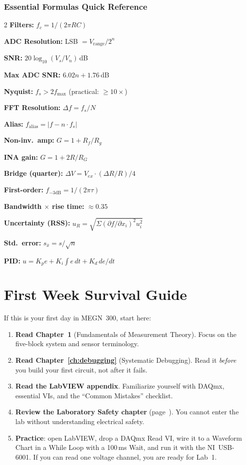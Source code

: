 \documentclass[11pt,letterpaper,twoside,openany]{book}
\begin{document}
\subsection*{Essential Formulas Quick Reference}
\begin{multicols}{2}
\small
\textbf{Filters:} $f_c = 1/(2\pi RC)$

\textbf{ADC Resolution:} LSB $= V_{\text{range}}/2^n$

\textbf{SNR:} $20\log_{10}(V_s/V_n)$\,dB

\textbf{Max ADC SNR:} $6.02n + 1.76$\,dB

\textbf{Nyquist:} $f_s > 2 f_{\max}$ (practical: $\geq 10\times$)

\textbf{FFT Resolution:} $\Delta f = f_s / N$

\textbf{Alias:} $f_{\text{alias}} = |f - n \cdot f_s|$

\textbf{Non-inv.\ amp:} $G = 1 + R_f/R_g$

\textbf{INA gain:} $G = 1 + 2R/R_G$

\textbf{Bridge (quarter):} $\Delta V = V_{ex} \cdot (\Delta R/R) / 4$

\textbf{First-order:} $f_{-3\text{dB}} = 1/(2\pi\tau)$

\textbf{Bandwidth $\times$ rise time:} $\approx 0.35$

\textbf{Uncertainty (RSS):} $u_R = \sqrt{\Sigma(\partial f/\partial x_i)^2 u_i^2}$

\textbf{Std.\ error:} $s_{\bar{x}} = s/\sqrt{n}$

\textbf{PID:} $u = K_p e + K_i \int e\,dt + K_d\, de/dt$
\end{multicols}

\newpage
\chapter*{First Week Survival Guide}

If this is your first day in MEGN~300, start here:

\begin{enumerate}[leftmargin=2em]
\item \textbf{Read Chapter~1} (Fundamentals of Measurement Theory). Focus on the five-block system and sensor terminology.
\item \textbf{Read Chapter~\ref{ch:debugging}} (Systematic Debugging). Read it \emph{before} you build your first circuit, not after it fails.
\item \textbf{Read the LabVIEW appendix}. Familiarize yourself with DAQmx, essential VIs, and the ``Common Mistakes'' checklist.
\item \textbf{Review the Laboratory Safety chapter} (page~\pageref{ch:safety}). You cannot enter the lab without understanding electrical safety.
\item \textbf{Practice}: open LabVIEW, drop a DAQmx Read VI, wire it to a Waveform Chart in a While Loop with a 100\,ms Wait, and run it with the NI~USB-6001. If you can read one voltage channel, you are ready for Lab~1.
\end{enumerate}
\end{document}
